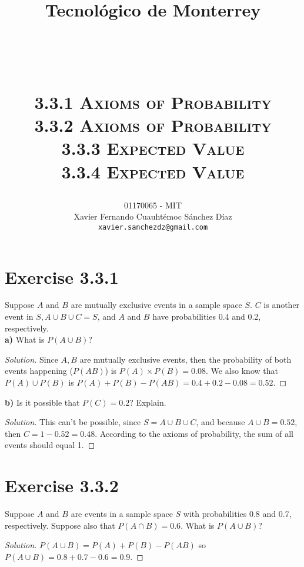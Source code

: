 \documentclass[titlepage, letterpaper, fleqn]{article}
\title{
\vspace{1in}
\textbf{Tecnológico de Monterrey} \\
\vspace{0.5in}
\textmd{\mahclass} \\
\large{\textit{\mahteacher}} \\
\vspace{0.5in}
\textsc{\mahtitle}\\
\textsc{3.3.1 Axioms of Probability}\\
\textsc{3.3.2 Axioms of Probability}\\
\textsc{3.3.3 Expected Value}\\
\textsc{3.3.4 Expected Value}\\
\author{01170065  - MIT \\
Xavier Fernando Cuauhtémoc Sánchez Díaz \\
\texttt{xavier.sanchezdz@gmail.com}}
\date{\mahdate}
}
\newcommand{\spacepls}{\vspace{5mm}}
\renewcommand\qedsymbol{\(\blacksquare\)}
\newenvironment{solution}
{\renewcommand\qedsymbol{$\square$}\begin{proof}[Solution]}
{\end{proof}}
\begin{document}
\begin{titlepage}
\maketitle
\end{titlepage}

%
%

\section{Exercise 3.3.1}

{\large Suppose \(A\) and \(B\) are mutually exclusive events in a sample space \(S\). \(C\) is another event in \(S, A \cup B \cup C = S\), and \(A\) and \(B\) have probabilities 0.4 and 0.2, respectively.\\
\textbf{a)} What is \(P(A \cup B)\)?}

\begin{solution}
Since \(A,B\) are mutually exclusive events, then the probability of both events happening (\(P(AB)\)) is \(P(A) \times P(B) = 0.08\).
We also know that \(P(A) \cup P(B)\) is \(P(A) + P(B) - P(AB) = 0.4 + 0.2 - 0.08 = 0.52\).
\end{solution}

\spacepls

{\large \textbf{b)} Is it possible that \(P(C) = 0.2\)? Explain.}

\begin{solution}
This can't be possible, since \(S = A \cup B \cup C\), and because \(A \cup B = 0.52\), then \(C = 1 - 0.52 = 0.48\). According to the axioms of probability, the sum of all events should equal 1.
\end{solution}

\spacepls

\section{Exercise 3.3.2}

{\large Suppose \(A\) and \(B\) are events in a sample space \(S\) with probabilities 0.8 and 0.7, respectively. Suppose also that \(P(A \cap B) = 0.6\). What is \(P(A \cup B)\)?}

\begin{solution}
\(P(A \cup B) = P(A) + P(B) - P(AB)\) so  \(P(A \cup B) = 0.8 + 0.7 - 0.6 = 0.9\).
\end{solution}

\spacepls
\end{document}
